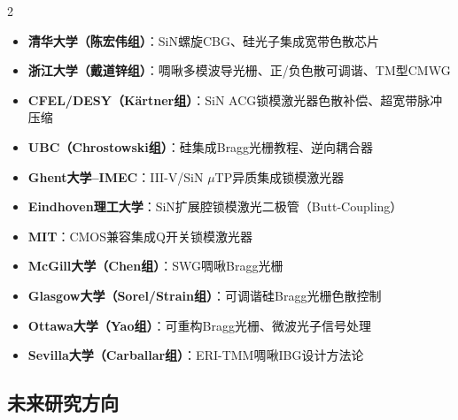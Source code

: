 \documentclass[12pt,a4paper,twoside]{article}
\begin{document}
\begin{multicols}{2}
\begin{itemize}[leftmargin=*,itemsep=1pt]
\item \textbf{清华大学（陈宏伟组）}：SiN螺旋CBG、硅光子集成宽带色散芯片
\item \textbf{浙江大学（戴道锌组）}：啁啾多模波导光栅、正/负色散可调谐、TM型CMWG
\item \textbf{CFEL/DESY（K\"{a}rtner组）}：SiN ACG锁模激光器色散补偿、超宽带脉冲压缩
\item \textbf{UBC（Chrostowski组）}：硅集成Bragg光栅教程、逆向耦合器
\item \textbf{Ghent大学--IMEC}：III-V/SiN $\mu$TP异质集成锁模激光器
\item \textbf{Eindhoven理工大学}：SiN扩展腔锁模激光二极管（Butt-Coupling）
\item \textbf{MIT}：CMOS兼容集成Q开关锁模激光器
\item \textbf{McGill大学（Chen组）}：SWG啁啾Bragg光栅
\item \textbf{Glasgow大学（Sorel/Strain组）}：可调谐硅Bragg光栅色散控制
\item \textbf{Ottawa大学（Yao组）}：可重构Bragg光栅、微波光子信号处理
\item \textbf{Sevilla大学（Carballar组）}：ERI-TMM啁啾IBG设计方法论
\end{itemize}
\end{multicols}

\subsection{未来研究方向}
\end{document}
